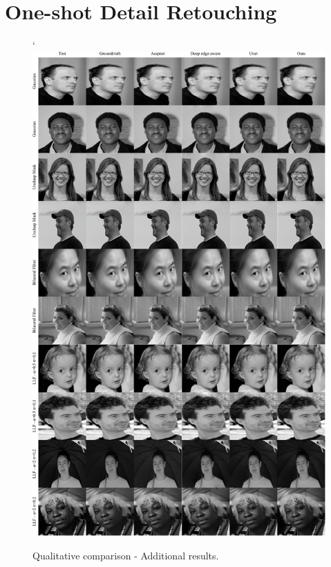 \chapter{One-shot Detail Retouching}
\label{one-shot-add}


\begin{figure}[ht]
  \centering
  {`\includegraphics[width=0.8\linewidth]{Chapters/appendix-figs/face.pdf}}

   \caption{Qualitative comparison - Additional results.}
   \label{fig:appendix-DR-face}
\end{figure}

